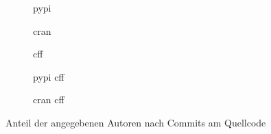 \begin{figure}
    \begin{subfigure}{.5\textwidth}
        \centering
        
        \caption{\gls{pypi}}
        \label{fig:common_authors_2_pypi}
    \end{subfigure}%
    \begin{subfigure}{.5\textwidth}
        \centering
        
        \caption{\gls{cran}}
        \label{fig:common_authors_2_cran}
    \end{subfigure}
    \begin{subfigure}{.5\textwidth}
        \centering
        
        \caption{\gls{cff}}
        \label{fig:common_authors_2_cff}
    \end{subfigure}%
    \begin{subfigure}{.5\textwidth}
        \centering
        
        \caption{\gls{pypi} \gls{cff}}
        \label{fig:common_authors_2_pypi_cff}
    \end{subfigure}
    \centering
    \begin{subfigure}{.5\textwidth}
        \centering
        
        \caption{\gls{cran} \gls{cff}}
        \label{fig:common_authors_2_cran_cff}
    \end{subfigure}
    \caption{Anteil der angegebenen Autoren nach Commits am Quellcode}
    \label{fig:common_authors_2}
    \small

\end{figure}
